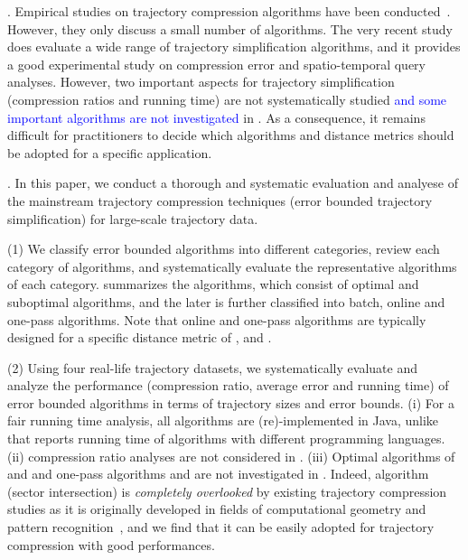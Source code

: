 . Empirical studies on trajectory compression algorithms have been conducted~\cite{Muckell:Compression,MuckellHLR10,mThesis}. However, they only discuss a small number of algorithms. The very recent study \cite{Zhang:Evaluation} does evaluate a wide range of trajectory simplification algorithms,
and it provides a good experimental study on compression error and spatio-temporal query analyses. However, two important aspects for trajectory simplification (\ie  compression ratios and running time) are not systematically studied \textcolor{blue}{and some important algorithms are not investigated} in \cite{Zhang:Evaluation}. As a consequence, it remains difficult for practitioners to decide which algorithms and distance metrics should be adopted for a specific application.






.
In this paper, we conduct a thorough and systematic evaluation and analyese of the mainstream trajectory compression techniques (\ie  error bounded trajectory simplification) for large-scale trajectory data.

\sstab (1) We classify error bounded \lsa algorithms into different categories, review each category of algorithms, and systematically evaluate the representative algorithms of each category.
%
 summarizes the algorithms, which consist of
optimal and suboptimal algorithms, and the later is further classified into batch, online and one-pass algorithms.
Note that online and one-pass algorithms are typically designed for a specific distance metric of \ped, \sed and \dad.

\sstab (2) Using four real-life trajectory datasets, we systematically evaluate and analyze the performance (compression ratio, average error and running
time) of error bounded \lsa algorithms in terms of trajectory sizes and error bounds.
%
(i) For a fair running time analysis, all algorithms are (re)-implemented in Java, unlike \cite{Zhang:Evaluation} that reports running time of algorithms with different programming languages. (ii) compression ratio analyses are not considered in \cite{Zhang:Evaluation}. (iii) Optimal algorithms of \ped and \sed and one-pass algorithms \siped and \cised are not investigated in \cite{Zhang:Evaluation}. Indeed, algorithm \siped (sector intersection) is {\em completely overlooked} by existing trajectory compression studies as it is originally developed in fields of computational geometry and pattern recognition~\cite{Williams:Longest,Sklansky:Cone,Dunham:Cone, Zhao:Sleeve}, and we find that it can be easily adopted for trajectory compression with good performances.


